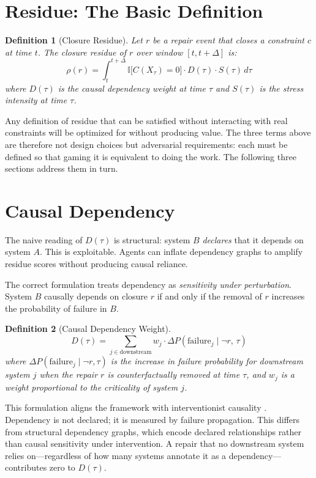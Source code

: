 \documentclass[12pt]{article}
\newtheorem{definition}{Definition}
\begin{document}
\section{Residue: The Basic Definition}

\begin{definition}[Closure Residue]
Let $r$ be a repair event that closes a constraint $c$ at time $t$.
The \emph{closure residue} of $r$ over window $[t, t+\Delta]$ is:
\[
  \rho(r) = \int_{t}^{t+\Delta}
    \mathbb{I}\bigl[C(X_\tau) = 0\bigr]
    \cdot D(\tau)
    \cdot S(\tau)
  \, d\tau
\]
where $D(\tau)$ is the causal dependency weight at time $\tau$ and
$S(\tau)$ is the stress intensity at time $\tau$.
\end{definition}

Any definition of residue that can be satisfied without interacting with
real constraints will be optimized for without producing value. The
three terms above are therefore not design choices but adversarial
requirements: each must be defined so that gaming it is equivalent to
doing the work. The following three sections address them in turn.

\section{Causal Dependency}

The naive reading of $D(\tau)$ is structural: system $B$ \emph{declares}
that it depends on system $A$. This is exploitable. Agents can inflate
dependency graphs to amplify residue scores without producing causal
reliance.

The correct formulation treats dependency as \emph{sensitivity under
perturbation}. System $B$ causally depends on closure $r$ if and only
if the removal of $r$ increases the probability of failure in $B$.

\begin{definition}[Causal Dependency Weight]
\[
  D(\tau) = \sum_{j \in \mathrm{downstream}}
    w_j \cdot \Delta P\!\left(\mathrm{failure}_j \mid \neg r,\, \tau\right)
\]
where $\Delta P(\mathrm{failure}_j \mid \neg r, \tau)$ is the increase
in failure probability for downstream system $j$ when the repair $r$ is
counterfactually removed at time $\tau$, and $w_j$ is a weight
proportional to the criticality of system $j$.
\end{definition}

This formulation aligns the framework with interventionist causality
\cite{pearl2009,spirtes2000}.
Dependency is not declared; it is measured by failure propagation. This
differs from structural dependency graphs, which encode declared
relationships rather than causal sensitivity under intervention. A
repair that no downstream system relies on---regardless of how many
systems annotate it as a dependency---contributes zero to $D(\tau)$.
\end{document}
